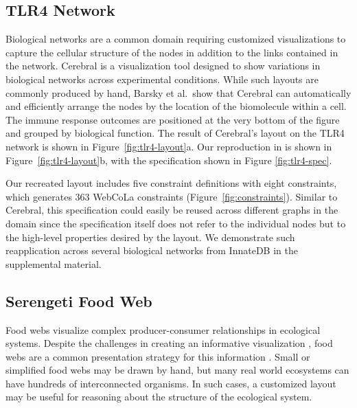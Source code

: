 \subsection{TLR4 Network}
\tlrfourSpec
Biological networks are a common domain requiring customized visualizations
to capture the cellular structure of the nodes in addition to the links
contained in the network. Cerebral \cite{barsky2008cerebral} is a visualization
tool designed to show variations in biological networks across experimental
conditions. While such layouts are commonly produced by hand, Barsky et al.\ show that 
Cerebral can automatically and efficiently arrange the nodes by the location
of the biomolecule within a cell. The immune response outcomes are positioned
at the very bottom of the figure and grouped by biological function. The result
of Cerebral's layout on the TLR4 network is shown in Figure~\ref{fig:tlr4-layout}a.
Our reproduction in \projectname is shown in Figure~\ref{fig:tlr4-layout}b,
with the specification shown in Figure \ref{fig:tlr4-spec}.

Our recreated layout includes five constraint definitions with eight \projectname
constraints, which generates $363$ WebCoLa constraints (Figure~\ref{fig:constraints}).
Similar to Cerebral, this \projectname specification could easily be reused 
across different graphs in the domain since the specification itself does
not refer to the individual nodes but to the high-level properties desired
by the layout. We demonstrate such reapplication across several 
biological networks from InnateDB \cite{breuer2012innatedb} in the supplemental material.

\subsection{Serengeti Food Web}
\krugerLayout
\serengetiHybrid

Food webs visualize complex producer-consumer relationships in ecological
systems. Despite the challenges in creating an informative
visualization \cite{kearney2016blog}, food webs are a common presentation strategy for this information
\cite{lavigne1996cod,yodzis1998local,cohen2003ecological,hinke2004visualizing,harper2006dynamic,baskerville2011spatial,kearney2012coupling,kearney2013amplification,benson2016higher,kruger2017}.
Small or simplified food webs may be
drawn by hand, but many real world ecosystems can have hundreds of
interconnected organisms. In such cases, a customized layout may be useful
for reasoning about the structure of the ecological system.

